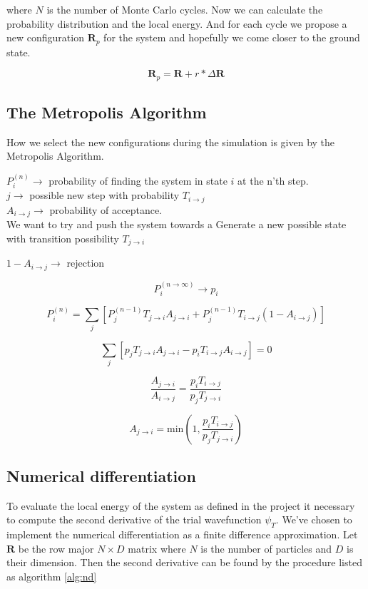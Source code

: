 where $N$ is the number of Monte Carlo cycles. Now we can calculate the probability distribution and the local energy. And for each cycle we propose a new configuration $\mathbf{R}_p$ for the system and hopefully we come closer to the ground state.

$$\mathbf{R}_p = \mathbf{R} + r \ast \Delta \mathbf{R}$$

\subsection{The Metropolis Algorithm}

How we select the new configurations during the simulation is given by the Metropolis Algorithm.

$P_i^{(n)} \rightarrow$ probability of finding the system in state $i$ at the n'th step.
\\
$j \rightarrow$ possible new step with probability $T_{i \rightarrow j}$
\\
$A_{i \rightarrow j} \rightarrow$ probability of acceptance. 
\\
We want to try and push the system towards a 
Generate a new possible state with transition possibility 
$T_{j \rightarrow i}$ 

$1 - A_{i \rightarrow j} \rightarrow$ rejection

$$P_i^{(n \rightarrow \infty)} \rightarrow p_i$$

$$P_i^{(n)} = \sum_j \left[P_j^{(n-1)} T_{j \rightarrow i}A_{j \rightarrow i} + P_j^{(n-1)}T_{i \rightarrow j}(1 - A_{i \rightarrow j})\right]$$

$$\sum_j [p_j T_{j \rightarrow i}A_{j \rightarrow i} - p_i T_{i \rightarrow j}A_{i \rightarrow j}] = 0$$

$$\frac{A_{j \rightarrow i}}{A_{i \rightarrow j}} = \frac{p_i T_{i \rightarrow j}}{p_j T_{j \rightarrow i}}$$

$$A_{j \rightarrow i} = \mathrm{min} \left( 1, \frac{p_i T_{i \rightarrow j}}{p_j T_{j \rightarrow i}}\right)$$

\subsection{Numerical differentiation}
To evaluate the local energy of the system as defined in the project it necessary to compute the second derivative of the trial wavefunction $\psi_T$. We've chosen to implement the numerical differentiation as a finite difference approximation. Let $\mathbf{R}$ be the row major $N \times D$ matrix where $N$ is the number of particles and $D$ is their dimension. Then the second derivative can be found by the procedure listed as algorithm \ref{alg:nd}

